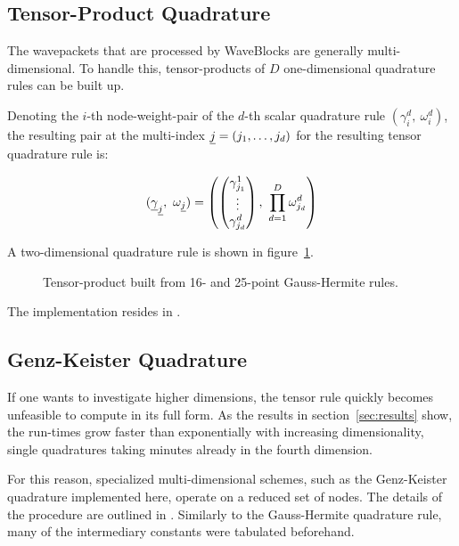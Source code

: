 \subsection{Tensor-Product Quadrature}
\label{subsec:tpquad}

The wavepackets that are processed by WaveBlocks are generally multi-dimensional.
To handle this, tensor-products of $D$ one-dimensional quadrature rules can be
built up.

Denoting the $i$-th node-weight-pair of the $d$-th scalar quadrature rule
$(\gamma_i^d,\ \omega_i^d)$, the resulting pair at the multi-index $\underline{j} =
(j_1, \ldots, j_d)$ for the resulting tensor quadrature rule is:

\begin{equation}
  (\vect{\gamma}_{\vect{j}},\ \omega_{\vect{j}}) = \left(
    \begin{pmatrix} \gamma_{j_1}^1 \\ \vdots \\ \gamma_{j_d}^d \end{pmatrix},
    \ \prod_{d=1}^D \omega_{j_d}^d
  \right)
\end{equation}

A two-dimensional quadrature rule is shown in figure~\ref{fig:tpexample}.

\begin{figure}
  \center
  
  \caption{Tensor-product built from 16- and 25-point Gauss-Hermite rules.}
  \label{fig:tpexample}
\end{figure}

The implementation resides in .


\subsection{Genz-Keister Quadrature}
\label{subsec:gkquad}

If one wants to investigate higher dimensions, the tensor rule quickly becomes
unfeasible to compute in its full form.
As the results in section~\ref{sec:results} show, the run-times grow faster than
exponentially with increasing dimensionality, single quadratures taking minutes
already in the fourth dimension.

For this reason, specialized multi-dimensional schemes, such as the Genz-Keister
quadrature implemented here, operate on a reduced set of nodes.
The details of the procedure are outlined in \cite{B15_601}.
Similarly to the Gauss-Hermite quadrature rule, many of the intermediary
constants were tabulated beforehand.

